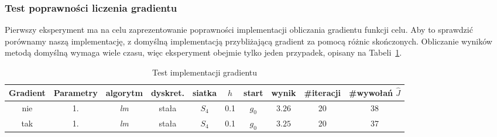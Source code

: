 \documentclass[11pt]{article}
\begin{document}
\subsubsection{Test poprawności liczenia gradientu}
Pierwszy eksperyment ma na celu zaprezentowanie poprawności implementacji obliczania gradientu funkcji celu. Aby to sprawdzić porównamy naszą implementację, z domyślną implementacją przybliżającą gradient za pomocą różnic skończonych. Obliczanie wyników metodą domyślną wymaga wiele czasu, więc eksperyment obejmie tylko jeden przypadek, opisany na Tabeli~\ref{test_tbl}.
\begin{table}[h]
  \begin{center}
    \begin{tabular}{|c|c|c|c|c|c|c|c|c|c|}
      \hline
      Gradient & Parametry & algorytm & dyskret. & siatka & $h$ & start & wynik & \#iteracji & \#wywołań $\hat{J}$ \\
      \hline
      nie & 1. & {\it lm\/} & stała & $S_4$ & 0.1 & $g_0$ & $3.26$ & 20 & 38 \\
      \hline
      tak & 1. & {\it lm\/} & stała & $S_4$ & 0.1 & $g_0$ & $3.25$ & 20 & 37 \\
      \hline
    \end{tabular}
    \caption{Test implementacji gradientu}\label{test_tbl}
  \end{center}
\end{table}
\end{document}
